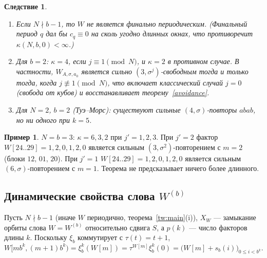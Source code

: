 \documentclass[a4paper,14pt]{extreport}
\theoremstyle{plain}
\newtheorem{corollary}[theorem]{Следствие}
\theoremstyle{definition}
\newtheorem{example}{Пример}
\theoremstyle{remark}
\begin{document}
\begin{corollary}\label{tw:cor}
	\begin{enumerate}
		\item Если $N\nmid b-1$, то $W$ не является финально периодическим.
		(Финальный период $q$ дал бы $c_q\equiv0$ на сколь угодно длинных окнах, что противоречит $\kappa(N,b,0)<\infty$.)
		\item Для $b=2$: $\kappa=4$, если $j\equiv1\pmod N$, и $\kappa=2$ в противном случае. В частности, $W_{A,\sigma,a_0}$ является
		сильно $(3,\sigma^j)$-свободным тогда и только тогда, когда $j\not\equiv1\pmod N$, что включает классический случай $j=0$ (свобода от кубов)
		и восстанавливает теорему~\ref{avoidance}.
		\item Для $N=2$, $b=2$ (Туэ--Морс): существуют сильные $(4,\sigma)$-повторы $abab$, но ни одного при $k=5$.
	\end{enumerate}
\end{corollary}

\begin{example}
	$N=b=3$: $\kappa=6,3,2$ при $j'=1,2,3$. При $j'=2$ фактор $W[24..29]=1,2,0,1,2,0$ является сильным $(3,\sigma^2)$-повторением с $m=2$
	(блоки $12,\,01,\,20$). При $j'=1$ $W[24..29]=1,2,0,1,2,0$ является сильным $(6,\sigma)$-повторением с $m=1$. Теорема не предсказывает ничего более длинного.
\end{example}
\subsection{\texorpdfstring{Динамические свойства слова $W^{(b)}$}{Динамические свойства слова W(b)}}\label{sec:dynWb}

Пусть $N\nmid b-1$ (иначе $W$ периодично, теорема~\ref{tw:main}(i)), $X_W$ --- замыкание орбиты слова $W=W^{(b)}$
относительно сдвига $S$, а $p(k)$ --- число факторов длины $k$. Поскольку $\xi_b$ коммутирует с $\tau(t)=t+1$,
\begin{equation}\label{eq:blocks}
	W[mb^k,(m+1)b^k)=\xi_b^k(W[m])=\tau^{W[m]}\xi_b^k(0)=\bigl(W[m]+s_b(i)\bigr)_{0\le i<b^k}.
\end{equation}
\end{document}
